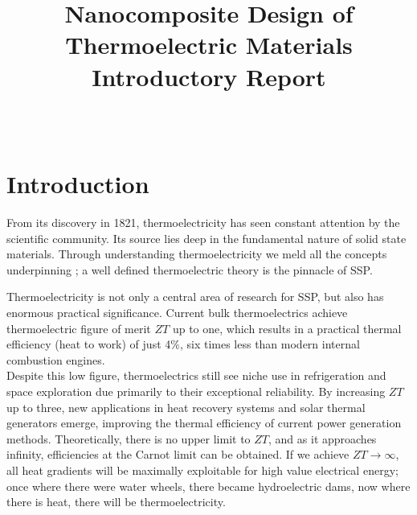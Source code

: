 \documentclass[a4paper,10pt,journal]{IEEEtran}
\begin{document}
\title{Nanocomposite Design of Thermoelectric Materials\\Introductory
Report}
\author{\\
}


\section{Introduction}

From its discovery in 1821, thermoelectricity has seen constant
attention by the scientific community. Its source lies deep in the
fundamental nature of solid state materials. Through understanding
thermoelectricity we meld all the concepts underpinning
; a well defined thermoelectric
theory is the pinnacle of \ac{SSP}.


Thermoelectricity is not only a central area of research for
\ac{SSP}, but also has enormous practical significance. Current
bulk thermoelectrics achieve thermoelectric figure of merit $ZT$ up to
one, which results in a practical thermal efficiency (heat to work) of
just 4\%, six times less than modern internal combustion engines.\\
Despite this low figure, thermoelectrics still see niche use
in refrigeration and space exploration due primarily to their
exceptional reliability. By increasing $ZT$ up to three, new
applications in heat recovery systems and solar thermal generators
emerge, improving the thermal efficiency of current power generation
methods. Theoretically, there is no upper limit to $ZT$, and as it
approaches infinity, efficiencies at the Carnot limit can be obtained.
If we achieve $ZT \to\infty$, all heat gradients will be maximally
exploitable for high value electrical energy; once where there were
water wheels, there became hydroelectric dams, now where there is
heat, there will be thermoelectricity.
\end{document}
